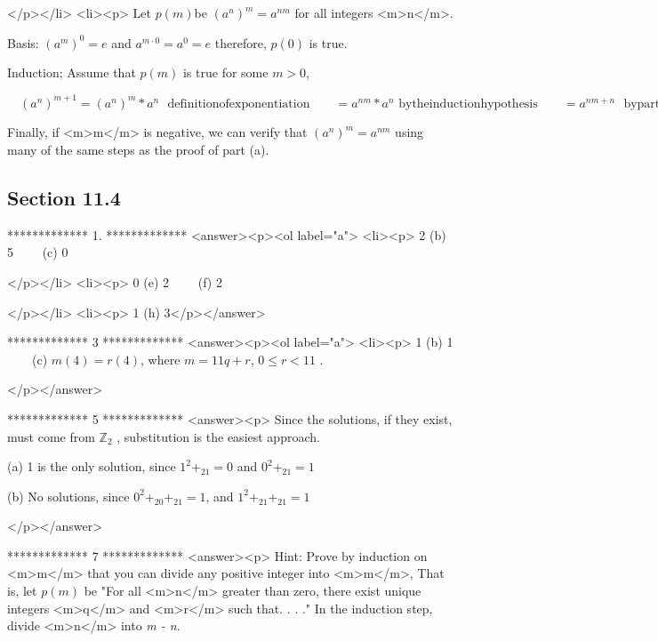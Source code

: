 </p></li>
<li><p> Let \(p(m)\)be \(\left(a^n\right)^m= a^{n m}\) for all integers <m>n</m>.



Basis: \(\left(a^m\right)^0= e\) and \(a^{m\cdot 0}=a^0= e\) therefore, \(p(0)\) is true.



Induction; Assume that \(p(m)\) is true for some \(m >\)0,



\(\quad \left(a^n\right)^{m+1}=\left(a^n\right)^m*a^n\text{    }\text{definition} \text{of} \text{exponentiation}\quad \quad =a^{n m}*a^n\text{
      }\text{by} \text{the} \text{induction} \text{hypothesis}\quad \quad =a^{n m + n}\text{          }\text{by} \text{part} (a) \text{of} \text{this}
\text{problem}\quad \quad =a^{n(m+1)}\text{          }\)



Finally, if <m>m</m> is negative, we can verify that \(\left(a^n\right)^m= a^{n m}\) using many of the same steps as the proof of part (a).


\subsection{Section 11.4}

*************
1.
*************
<answer><p><ol label="a">
<li><p> 2 (b) 5 $\quad \quad $(c) 0



   </p></li>
<li><p> 0 (e) 2 $\quad \quad $(f) 2 



   </p></li>
<li><p> 1 (h) 3</p></answer>


*************
3
*************
<answer><p><ol label="a">
<li><p> 1 (b) 1 $\quad \quad $(c) \(m(4) = r(4)\), where \(m = 11 q + r\), \(0 \leq  r < 11\) .

</p></answer>


*************
5
*************
<answer><p> Since the solutions, if they exist, must come from \(\mathbb{Z}_2\) , substitution is the easiest approach.



(a) 1 is the only solution, since  \(1^2+_21=0\)   and  \(0^2+_21=1\)



(b) No solutions, since \(0^2+_20+_21=1\), and  \(1^2+_21+_21=1\)

</p></answer>


*************
7
*************
<answer><p> Hint: Prove by induction on <m>m</m> that you can divide any positive integer into <m>m</m>, That is, let \(p(m)\) be $\texttt{"}$For all
<m>n</m> greater than zero, there exist unique integers <m>q</m> and <m>r</m> such that. . . .$\texttt{"}$ In the induction step, divide
<m>n</m> into \textit{ m - n}.


